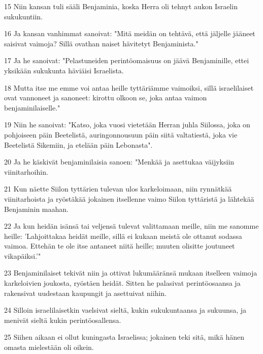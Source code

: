 \par 15 Niin kansan tuli sääli Benjaminia, koska Herra oli tehnyt aukon Israelin sukukuntiin.
\par 16 Ja kansan vanhimmat sanoivat: "Mitä meidän on tehtävä, että jäljelle jääneet saisivat vaimoja? Sillä ovathan naiset hävitetyt Benjaminista."
\par 17 Ja he sanoivat: "Pelastuneiden perintöomaisuus on jäävä Benjaminille, ettei yksikään sukukunta häviäisi Israelista.
\par 18 Mutta itse me emme voi antaa heille tyttäriämme vaimoiksi, sillä israelilaiset ovat vannoneet ja sanoneet: kirottu olkoon se, joka antaa vaimon benjaminilaiselle."
\par 19 Niin he sanoivat: "Katso, joka vuosi vietetään Herran juhla Siilossa, joka on pohjoiseen päin Beetelistä, auringonnousuun päin siitä valtatiestä, joka vie Beetelistä Sikemiin, ja etelään päin Lebonasta".
\par 20 Ja he käskivät benjaminilaisia sanoen: "Menkää ja asettukaa väijyksiin viinitarhoihin.
\par 21 Kun näette Siilon tyttärien tulevan ulos karkeloimaan, niin rynnätkää viinitarhoista ja ryöstäkää jokainen itsellenne vaimo Siilon tyttäristä ja lähtekää Benjaminin maahan.
\par 22 Ja kun heidän isänsä tai veljensä tulevat valittamaan meille, niin me sanomme heille: 'Lahjoittakaa heidät meille, sillä ei kukaan meistä ole ottanut sodassa vaimoa. Ettehän te ole itse antaneet niitä heille; muuten olisitte joutuneet vikapäiksi.'"
\par 23 Benjaminilaiset tekivät niin ja ottivat lukumääränsä mukaan itselleen vaimoja karkeloivien joukosta, ryöstäen heidät. Sitten he palasivat perintöosaansa ja rakensivat uudestaan kaupungit ja asettuivat niihin.
\par 24 Silloin israelilaisetkin vaelsivat sieltä, kukin sukukuntaansa ja sukuunsa, ja menivät sieltä kukin perintöosallensa.
\par 25 Siihen aikaan ei ollut kuningasta Israelissa; jokainen teki sitä, mikä hänen omasta mielestään oli oikein.


